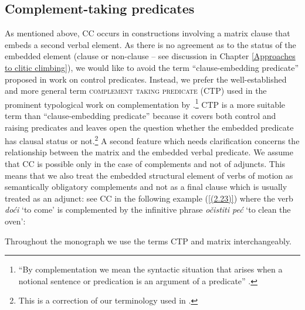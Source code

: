 \subsection{Complement-taking predicates}
\label{Complement-taking predicates}
As mentioned above, CC occurs in constructions involving a matrix clause that embeds a second verbal element. As there is no agreement as to the status of the embedded element (clause or non-clause – see discussion in Chapter \ref{Approaches to clitic climbing}), we would like to avoid the term ``clause-embedding predicate'' proposed in  work on control predicates. Instead, we prefer the well-established and more general term \textsc{complement taking predicate} (CTP) used in the prominent typological work on complementation by \citet{Noonan85}.\footnote{``By complementation we mean the syntactic situation that arises when a notional sentence or predication is an argument of a predicate'' \citep[42]{Noonan85}.} CTP is a more suitable term than ``clause-embedding predicate'' because it covers both control and raising predicates and leaves open the question whether the embedded predicate has clausal status or not.\footnote{This is a correction of our terminology used in \cite*{JHK17b}.} A second feature which needs clarification concerns the relationship between the matrix and the embedded verbal predicate. We assume that CC is possible only in the case of complements and not of adjuncts. This means that we also treat the embedded structural element of verbs of motion as semantically obligatory complements and not as a final clause which is usually treated as an adjunct: see CC in the following example (\ref{(2.23)}) where the verb \textit{doći} `to come' is complemented by the infinitive phrase \textit{očistiti peć} `to clean the oven':


\noindent Throughout the monograph we use the terms CTP and matrix interchangeably.



